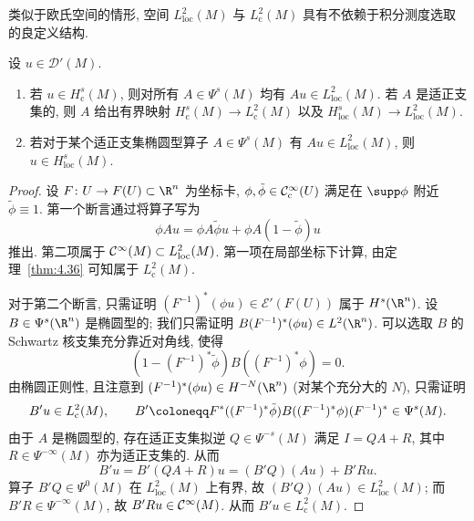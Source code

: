 类似于欧氏空间的情形, 空间 $L_{\mathrm{loc}}^2(M)$ 与 $L_{\mathrm{c}}^2(M)$ 具有不依赖于积分测度选取的良定义结构.

\begin{proposition}\label{prop:5.59}
设 $u \in \mathcal{D}'(M)$.
\begin{enumerate}
    \item 若 $u \in H_{\mathrm{c}}^s(M)$, 则对所有 $A \in \Psi^s(M)$ 均有 $A u \in L_{\mathrm{loc}}^2(M)$. 若 $A$ 是适正支集的, 则 $A$ 给出有界映射 $H_{\mathrm{c}}^s(M) \to L_{\mathrm{c}}^2(M)$ 以及 $H_{\mathrm{loc}}^s(M) \to L_{\mathrm{loc}}^2(M)$.
    \item 若对于某个适正支集椭圆型算子 $A \in \Psi^s(M)$ 有 $A u \in L_{\mathrm{loc}}^2(M)$, 则 $u \in H_{\mathrm{loc}}^s(M)$.
\end{enumerate}
\end{proposition}

\begin{proof}
设 $F \colon U \to F(U) \subset \R^n$ 为坐标卡, $\phi, \tilde{\phi} \in \mathcal{C}_{\mathrm{c}}^\infty(U)$ 满足在 $\supp\phi$ 附近 $\tilde{\phi} \equiv 1$. 第一个断言通过将算子写为
\begin{equation}\label{eq:5.140}
    \phi A u = \phi A \tilde{\phi} u + \phi A (1 - \tilde{\phi}) u
\end{equation}
推出. 第二项属于 $\mathcal{C}^\infty(M) \subset L_{\mathrm{loc}}^2(M)$. 第一项在局部坐标下计算, 由定理~\ref{thm:4.36} 可知属于 $L_{\mathrm{c}}^2(M)$.

对于第二个断言, 只需证明 $(F^{-1})^*(\phi u) \in \mathcal{E}'(F(U))$ 属于 $H^s(\R^n)$. 设 $B \in \Psi^s(\R^n)$ 是椭圆型的; 我们只需证明 $B(F^{-1})^*(\phi u) \in L^2(\R^n)$. 可以选取 $B$ 的 Schwartz 核支集充分靠近对角线, 使得
\begin{equation}\label{eq:5.141}
    (1 - (F^{-1})^* \tilde{\phi}) B ((F^{-1})^* \phi) = 0.
\end{equation}
由椭圆正则性, 且注意到 $(F^{-1})^*(\phi u) \in H^{-N}(\R^n)$ (对某个充分大的 $N$), 只需证明
\begin{equation}\label{eq:5.142}
    B' u \in L_{\mathrm{c}}^2(M), \qquad B' \defeq F^* ((F^{-1})^* \tilde{\phi}) B ((F^{-1})^* \phi) (F^{-1})^* \in \Psi^s(M).
\end{equation}
由于 $A$ 是椭圆型的, 存在适正支集拟逆 $Q \in \Psi^{-s}(M)$ 满足 $I = Q A + R$, 其中 $R \in \Psi^{-\infty}(M)$ 亦为适正支集的. 从而
\begin{equation}\label{eq:5.143}
    B' u = B'(Q A + R) u = (B' Q)(A u) + B' R u.
\end{equation}
算子 $B' Q \in \Psi^0(M)$ 在 $L_{\mathrm{loc}}^2(M)$ 上有界, 故 $(B' Q)(A u) \in L_{\mathrm{loc}}^2(M)$; 而 $B' R \in \Psi^{-\infty}(M)$, 故 $B' R u \in \mathcal{C}^\infty(M)$. 从而 $B' u \in L_{\mathrm{c}}^2(M)$.
\end{proof}

